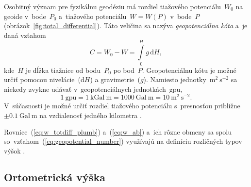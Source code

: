\documentclass[a4paper, 12pt]{book}
\newcommand{\diff}{\mathrm d}
\begin{document}
Osobitný význam pre fyzikálnu geodéziu má rozdiel tiažového potenciálu~$W_0$ na 
geoide v~bode~$P_0$ a~tiažového potenciálu~$W = W(P)$ v~bode~$P$ 
(obrázok~\ref{fig:total_differential}).  Táto veličina sa nazýva 
\emph{geopotenciálna kóta} a~je daná vzťahom
%
\begin{equation}
\label{eq:geopotential_number}
C = W_0 - W = \int\limits_0^H g \, \diff H{,}
\end{equation}
%
kde~$H$ je dĺžka tiažnice od bodu~$P_0$ po bod~$P$.  Geopotenciálnu kótu je 
možné určiť pomocou nivelácie~($\diff H$) a gravimetrie~($g$).  Namiesto 
jednotky~$\mathrm{m}^2\ \mathrm{s}^{-2}$ sa niekedy zvykne udávať 
v~geopotenciálnych jednotkách~gpu,
%
\begin{equation}
\label{eq:gpu_unit}
1\ \mathrm{gpu} = 1\ \mathrm{kGal} \ \mathrm{m} = 1000\ \mathrm{Gal}\ 
\mathrm{m} = 10\ \mathrm{m}^2 \ \mathrm{s}^{-2}{.}
\end{equation}
%
V~súčasnosti je možné určiť rozdiel tiažového potenciálu s~presnosťou približne 
$\pm 0.1\ \mathrm{Gal} \ \mathrm{m}$ na vzdialenosť jedného kilometra 
\parencite{MoritzPhysicalGeodesy}.

Rovnice~(\ref{eq:w_totdiff_plumb}) a~(\ref{eq:w_ab}) a~ich rôzne obmeny sa 
spolu so~vzťahom~(\ref{eq:geopotential_number}) využívajú na definíciu 
rozličných typov výšok 
\parencite{Jekeli2000a,MoritzPhysicalGeodesy,SansoGeodeticHeights}.  

\subsection{Ortometrická výška}
\label{sec:orthometric_height}
\end{document}
